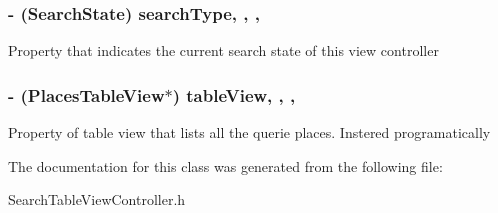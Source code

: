\subsubsection[{\texorpdfstring{search\+Type}{searchType}}]{\setlength{\rightskip}{0pt plus 5cm}-\/ (Search\+State) search\+Type\hspace{0.3cm}{\ttfamily [read]}, {\ttfamily [write]}, {\ttfamily [nonatomic]}, {\ttfamily [assign]}}\hypertarget{interface_search_table_view_controller_aa8e7e53bbf700399f86b5852e0f6011b}{}\label{interface_search_table_view_controller_aa8e7e53bbf700399f86b5852e0f6011b}
Property that indicates the current search state of this view controller 
\subsubsection[{\texorpdfstring{table\+View}{tableView}}]{\setlength{\rightskip}{0pt plus 5cm}-\/ (Places\+Table\+View$\ast$) table\+View\hspace{0.3cm}{\ttfamily [read]}, {\ttfamily [write]}, {\ttfamily [nonatomic]}, {\ttfamily [retain]}}\hypertarget{interface_search_table_view_controller_a6d2cc18899642830d84cb48d791c179d}{}\label{interface_search_table_view_controller_a6d2cc18899642830d84cb48d791c179d}
Property of table view that lists all the querie places. Instered programatically 

The documentation for this class was generated from the following file\+:\begin{DoxyCompactItemize}
\item 
Search\+Table\+View\+Controller.\+h\end{DoxyCompactItemize}
